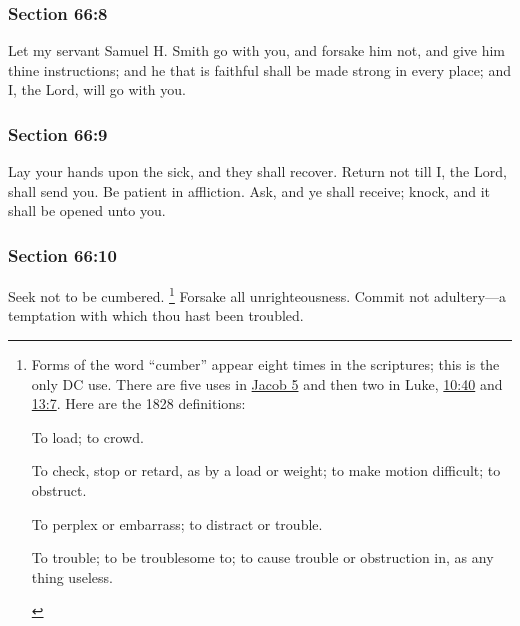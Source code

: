 	\subsubsection{Section 66:8} %
		\label{DC66-8}

		Let my servant Samuel H. Smith go with you, and forsake him not, and give him thine instructions; and he that is faithful shall be made strong in every place; and I, the Lord, will go with you.


	\subsubsection{Section 66:9} %
		\label{DC66-9}

		Lay your hands upon the sick, and they shall recover.  Return not till I, the Lord, shall send you.  Be patient in affliction.  Ask, and ye shall receive; knock, and it shall be opened unto you.


	\subsubsection{Section 66:10} %
		\label{DC66-10}

		Seek not to be cumbered.%
			\footnote{%
				Forms of the word ``cumber'' appear eight times in the scriptures; this is the only DC use. There are five uses in \hyperref[JACOB-5]{Jacob 5} and then two in Luke, \hyperref[LUKE-10-40]{10:40} and \hyperref[LUKE-13-7]{13:7}. Here are the 1828 definitions:
					\begin{compactitem}
						\item[1] To load; to crowd.
						\item[2] To check, stop or retard, as by a load or weight; to make motion difficult; to obstruct.
						\item[3] To perplex or embarrass; to distract or trouble.
						\item[4] To trouble; to be troublesome to; to cause trouble or obstruction in, as any thing useless.
					\end{compactitem}
				}
		Forsake all unrighteousness.  Commit not adultery---a temptation with which thou hast been troubled.


